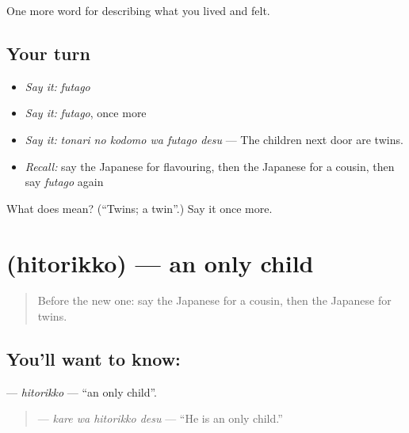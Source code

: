 \begin{grammarlens}[title={What you've built}]
One more word for describing what you lived and felt.
\end{grammarlens}

\subsection*{Your turn}
\begin{itemize}
\raggedright
  \item \emph{Say it:} \emph{futago}
  \item \emph{Say it:} \emph{futago}, once more
  \item \emph{Say it:} \emph{tonari no kodomo wa futago desu} — The children next door are twins.
  \item \emph{Recall:} say the Japanese for flavouring, then the Japanese for a cousin, then say \emph{futago} again
\end{itemize}

\begin{tcolorbox}[breakable,colback=teal!4,colframe=teal!35!black,title={Before you move on}]
What does  mean? (\textquotedblleft{}Twins; a twin\textquotedblright{}.) Say it once more.
\end{tcolorbox}
\section[\texorpdfstring{\ja{ひとりっこ} (hitorikko)}{ひとりっこ (hitorikko)}]{ (hitorikko) — an only child}

\label{lesson:JA-C476-hitorikko}



\begin{quote}
Before the new one: say the Japanese for a cousin, then the Japanese for twins.
\end{quote}

\subsection*{You'll want to know: }
\textbf{} — \emph{hitorikko} — \textquotedblleft{}an only child\textquotedblright{}.

\begin{quote}
\textbf{ } — \emph{kare wa hitorikko desu} — \textquotedblleft{}He is an only child.\textquotedblright{}
\end{quote}

